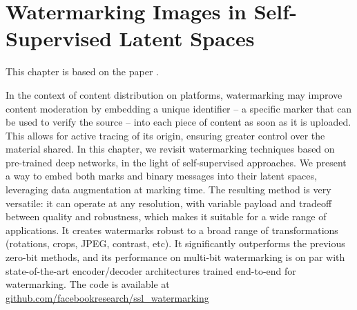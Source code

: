 
\chapter[Watermarking Images in Self-Supervised Latent Spaces]{Watermarking Images in Self-\\Supervised Latent Spaces}
\label{chapter:ssl-watermarking}

\newif\ifarxiv
\newif\ifnotarxiv

\arxivtrue
\notarxivfalse

This chapter is based on the paper .

In the context of content distribution on platforms, watermarking may improve content moderation by embedding a unique identifier -- a specific marker that can be used to verify the source -- into each piece of content as soon as it is uploaded. 
This allows for active tracing of its origin, ensuring greater control over the material shared.
In this chapter, we revisit watermarking techniques based on pre-trained deep networks, in the light of self-supervised approaches.
We present a way to embed both marks and binary messages into their latent spaces, leveraging data augmentation at marking time. 
The resulting method is very versatile: it can operate at any resolution, with variable payload and tradeoff between quality and robustness, which makes it suitable for a wide range of applications.
It creates watermarks robust to a broad range of transformations (rotations, crops, JPEG, contrast, etc). 
It significantly outperforms the previous zero-bit methods, and its performance on multi-bit watermarking is on par with state-of-the-art encoder/decoder architectures trained end-to-end for watermarking.
The code is available at \href{https://github.com/facebookresearch/ssl\_watermarking}{github.com/facebookresearch/ssl\_watermarking}

\newpage







